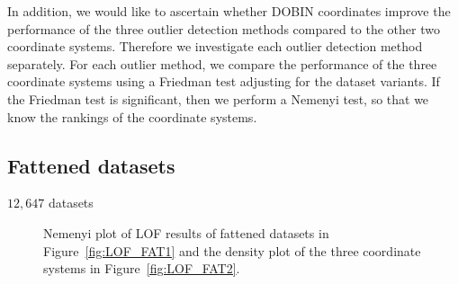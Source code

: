 \documentclass[11pt]{article}
\begin{document}
In addition, we would like to ascertain whether DOBIN coordinates improve the performance of the three outlier detection methods compared to the other two coordinate systems. Therefore we investigate each outlier detection method separately. For each outlier method, we compare the performance of the three coordinate systems using a Friedman test adjusting for the dataset variants. If the Friedman test is significant, then we perform a Nemenyi test, so that we know the rankings of the coordinate systems.  

\subsection{Fattened datasets}\label{sec:DatRepo1}
$12,647$ datasets


\begin{figure}[!t]
	\centering
	\caption{Nemenyi plot of LOF results of fattened datasets in Figure~\ref{fig:LOF_FAT1} and the density plot of the three coordinate systems in Figure~\ref{fig:LOF_FAT2}. }
	\label{fig:LOF_FAT}
\end{figure}
\end{document}
